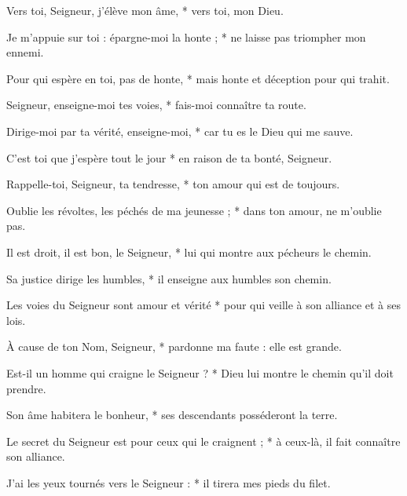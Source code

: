 \item Vers toi, Seigneur, j'élève mon âme, * vers toi, mon Dieu.

\item Je m'appuie sur toi : épargne-moi la honte ; * ne laisse pas triompher mon ennemi.

\item Pour qui espère en toi, pas de honte, * mais honte et déception pour qui trahit.

\item Seigneur, enseigne-moi tes voies, * fais-moi connaître ta route.

\item Dirige-moi par ta vérité, enseigne-moi, * car tu es le Dieu qui me sauve.

\item C'est toi que j'espère tout le jour * en raison de ta bonté, Seigneur.

\item Rappelle-toi, Seigneur, ta tendresse, * ton amour qui est de toujours.

\item Oublie les révoltes, les péchés de ma jeunesse ; * dans ton amour, ne m'oublie pas.

\item Il est droit, il est bon, le Seigneur, * lui qui montre aux pécheurs le chemin.

\item Sa justice dirige les humbles, * il enseigne aux humbles son chemin.

\item Les voies du Seigneur sont amour et vérité * pour qui veille à son alliance et à ses lois.

\item À cause de ton Nom, Seigneur, * pardonne ma faute : elle est grande.

\item Est-il un homme qui craigne le Seigneur ? * Dieu lui montre le chemin qu'il doit prendre.

\item Son âme habitera le bonheur, * ses descendants posséderont la terre.

\item Le secret du Seigneur est pour ceux qui le craignent ; * à ceux-là, il fait connaître son alliance.

\item J'ai les yeux tournés vers le Seigneur : * il tirera mes pieds du filet.

